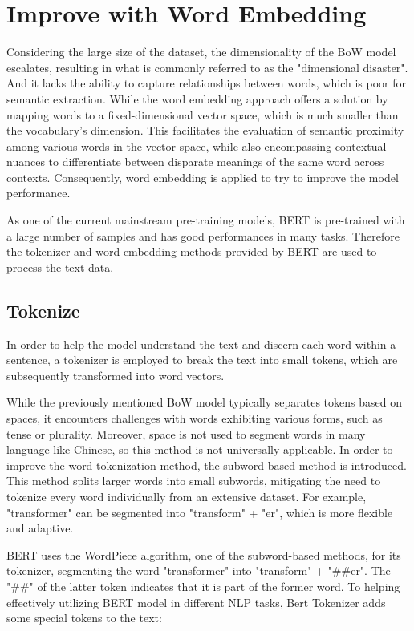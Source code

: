 \documentclass[ %
                    author={Bocheng Wang},
                supervisor={Dr. Qiang Liu},
                    degree={MSc},
                     title={A Research on Identification of Suicide Ideation in Texts with Multiple Models},
                      type={},
                      year={2024}]{dissertation}
\begin{document}
\section{Improve with Word Embedding}
\noindent
Considering the large size of the dataset, the dimensionality of the BoW model escalates, resulting in what is commonly referred to as the "dimensional disaster". And it lacks the ability to capture relationships between words, which is poor for semantic extraction. While the word embedding approach offers a solution by mapping words to a fixed-dimensional vector space, which is much smaller than the vocabulary's dimension. This facilitates the evaluation of semantic proximity among various words in the vector space, while also encompassing contextual nuances to differentiate between disparate meanings of the same word across contexts. Consequently, word embedding is applied to try to improve the model performance.

As one of the current mainstream pre-training models, BERT is pre-trained with a large number of samples and has good performances in many tasks. Therefore the tokenizer and word embedding methods provided by BERT are used to process the text data.

\subsection{Tokenize}
\noindent
In order to help the model understand the text and discern each word within a sentence, a tokenizer is employed to break the text into small tokens, which are subsequently transformed into word vectors. 

While the previously mentioned BoW model typically separates tokens based on spaces, it encounters challenges with words exhibiting various forms, such as tense or plurality. Moreover, space is not used to segment words in many language like Chinese, so this method is not universally applicable. In order to improve the word tokenization method, the subword-based method is introduced. This method splits larger words into small subwords, mitigating the need to tokenize every word individually from an extensive dataset. For example, "transformer" can be segmented into "transform" + "er", which is more flexible and adaptive. 

BERT uses the WordPiece algorithm\cite{wu2016google}, one of the subword-based methods, for its tokenizer, segmenting the word "transformer" into "transform" + "\#\#er". The "\#\#" of the latter token indicates that it is part of the former word. To helping effectively utilizing BERT model in different NLP tasks, Bert Tokenizer adds some special tokens to the text:
\end{document}
